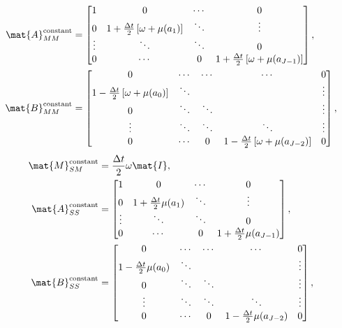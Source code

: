 \documentclass{jpmarticle}
\begin{document}
\begin{equation}
  \begin{split}
    \mat{A}_{MM}^{\text{constant}} &=
    \begin{bmatrix}
      1 & 0 & \cdots & 0
      \\
      0 & 1 + \frac{\Delta t}{2} \left[\omega + \mu(a_1)\right] &
      \ddots & \vdots
      \\
      \vdots & \ddots & \ddots & 0
      \\
      0 & \cdots & 0 &
      1 + \frac{\Delta t}{2} \left[\omega + \mu(a_{J - 1})\right]
    \end{bmatrix},
    \\
    \mat{B}_{MM}^{\text{constant}} &=
    \begin{bmatrix}
      0 & \cdots & \cdots & \cdots & 0
      \\
      1 - \frac{\Delta t}{2} \left[\omega + \mu(a_0)\right] & \ddots &
      & & \vdots
      \\
      0 & \ddots & \ddots & & \vdots
      \\
      \vdots & \ddots & \ddots & \ddots & \vdots
      \\
      0 & \cdots & 0 &
      1 - \frac{\Delta t}{2} \left[\omega + \mu(a_{J - 2})\right] & 0
    \end{bmatrix},
  \end{split}
\end{equation}
\begin{equation}
  \begin{split}
    \mat{M}_{SM}^{\text{constant}} &=
    \frac{\Delta t}{2} \omega \mat{I},
    \\
    \mat{A}_{SS}^{\text{constant}} &=
    \begin{bmatrix}
      1 & 0 & \cdots & 0
      \\
      0 & 1 + \frac{\Delta t}{2} \mu(a_1) &
      \ddots & \vdots
      \\
      \vdots & \ddots & \ddots & 0
      \\
      0 & \cdots & 0 &
      1 + \frac{\Delta t}{2} \mu(a_{J - 1})
    \end{bmatrix},
    \\
    \mat{B}_{SS}^{\text{constant}} &=
    \begin{bmatrix}
      0 & \cdots & \cdots & \cdots & 0
      \\
      1 - \frac{\Delta t}{2} \mu(a_0) & \ddots &
      & & \vdots
      \\
      0 & \ddots & \ddots & & \vdots
      \\
      \vdots & \ddots & \ddots & \ddots & \vdots
      \\
      0 & \cdots & 0 &
      1 - \frac{\Delta t}{2} \mu(a_{J - 2}) & 0
    \end{bmatrix},
  \end{split}
\end{equation}
\end{document}
